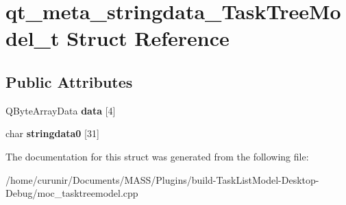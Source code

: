\hypertarget{structqt__meta__stringdata___task_tree_model__t}{}\section{qt\+\_\+meta\+\_\+stringdata\+\_\+\+Task\+Tree\+Model\+\_\+t Struct Reference}
\label{structqt__meta__stringdata___task_tree_model__t}
\subsection*{Public Attributes}
\begin{DoxyCompactItemize}
\item 
Q\+Byte\+Array\+Data {\bfseries data} \mbox{[}4\mbox{]}\hypertarget{structqt__meta__stringdata___task_tree_model__t_a5176d01b7f606f52d824d5d74f71e930}{}\label{structqt__meta__stringdata___task_tree_model__t_a5176d01b7f606f52d824d5d74f71e930}

\item 
char {\bfseries stringdata0} \mbox{[}31\mbox{]}\hypertarget{structqt__meta__stringdata___task_tree_model__t_a87a9aab03824bdaffc5cda396fa16eb9}{}\label{structqt__meta__stringdata___task_tree_model__t_a87a9aab03824bdaffc5cda396fa16eb9}

\end{DoxyCompactItemize}


The documentation for this struct was generated from the following file\+:\begin{DoxyCompactItemize}
\item 
/home/curunir/\+Documents/\+M\+A\+S\+S/\+Plugins/build-\/\+Task\+List\+Model-\/\+Desktop-\/\+Debug/moc\+\_\+tasktreemodel.\+cpp\end{DoxyCompactItemize}
